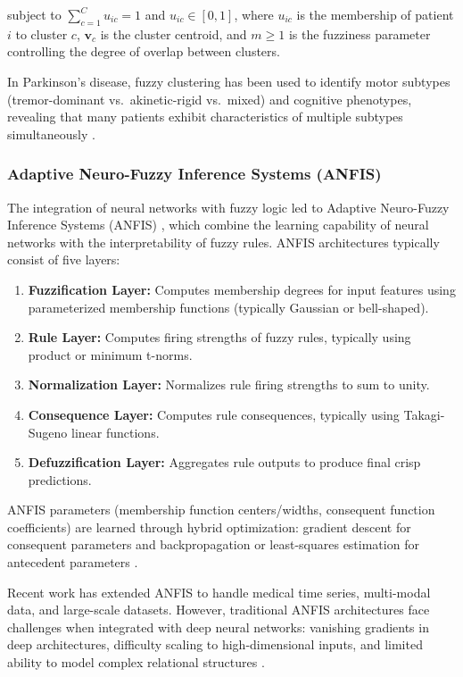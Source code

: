 \documentclass[conference]{IEEEtran}
\begin{document}
subject to $\sum_{c=1}^{C} u_{ic} = 1$ and $u_{ic} \in [0,1]$, where $u_{ic}$ is the membership of patient $i$ to cluster $c$, $\mathbf{v}_c$ is the cluster centroid, and $m \geq 1$ is the fuzziness parameter controlling the degree of overlap between clusters.

In Parkinson's disease, fuzzy clustering has been used to identify motor subtypes (tremor-dominant vs.\ akinetic-rigid vs.\ mixed) and cognitive phenotypes, revealing that many patients exhibit characteristics of multiple subtypes simultaneously \cite{Fereshtehnejad2017}.

\subsubsection{Adaptive Neuro-Fuzzy Inference Systems (ANFIS)}

The integration of neural networks with fuzzy logic led to Adaptive Neuro-Fuzzy Inference Systems (ANFIS) \cite{Jang1993}, which combine the learning capability of neural networks with the interpretability of fuzzy rules. ANFIS architectures typically consist of five layers:

\begin{enumerate}
\item \textbf{Fuzzification Layer:} Computes membership degrees for input features using parameterized membership functions (typically Gaussian or bell-shaped).
\item \textbf{Rule Layer:} Computes firing strengths of fuzzy rules, typically using product or minimum t-norms.
\item \textbf{Normalization Layer:} Normalizes rule firing strengths to sum to unity.
\item \textbf{Consequence Layer:} Computes rule consequences, typically using Takagi-Sugeno linear functions.
\item \textbf{Defuzzification Layer:} Aggregates rule outputs to produce final crisp predictions.
\end{enumerate}

ANFIS parameters (membership function centers/widths, consequent function coefficients) are learned through hybrid optimization: gradient descent for consequent parameters and backpropagation or least-squares estimation for antecedent parameters \cite{Nauck1997}.

Recent work has extended ANFIS to handle medical time series, multi-modal data, and large-scale datasets. However, traditional ANFIS architectures face challenges when integrated with deep neural networks: vanishing gradients in deep architectures, difficulty scaling to high-dimensional inputs, and limited ability to model complex relational structures \cite{Wang2019}.
\end{document}
